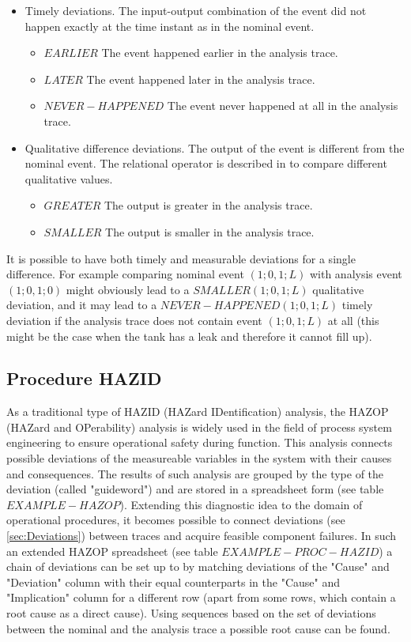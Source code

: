 \documentclass[conference]{IEEEtran}
\begin{document}
\begin{itemize}
\item Timely deviations. The input-output combination of the event did not happen exactly at the time instant as in the nominal event. 
	\begin{itemize}
	  \item $EARLIER$ The event happened earlier in the analysis trace.
	  \item $LATER$ The event happened later in the analysis trace.
	  \item $NEVER-HAPPENED$ The event never happened at all in the analysis trace.
	\end{itemize}
\item Qualitative difference deviations. The output of the event is different from the nominal event. The relational operator is described in \cite{QUALCAL} to compare different qualitative values.
	\begin{itemize}
	  \item $GREATER$ The output is greater in the analysis trace.
	  \item $SMALLER$ The output is smaller in the analysis trace.
	\end{itemize}
\end{itemize}

It is possible to have both timely and measurable deviations for a single difference. For example comparing nominal event $(1;0,1;L)$ with analysis event $(1;0,1;0)$ might obviously lead to a $SMALLER(1;0,1;L)$ qualitative deviation, and it may lead to a $NEVER-HAPPENED(1;0,1;L)$ timely deviation if the analysis trace does not contain event $(1;0,1;L)$ at all (this might be the case when the tank has a leak and therefore it cannot fill up).

\subsection{Procedure HAZID}
\label{sec:prochazid}

As a traditional type of HAZID (HAZard IDentification) analysis, the HAZOP (HAZard and OPerability) analysis is widely used in the field of process system engineering to ensure operational safety during function. This analysis connects possible deviations of the measureable variables in the system with their causes and consequences. The results of such analysis are grouped by the type of the deviation (called "guideword") and are stored in a spreadsheet form (see table $EXAMPLE-HAZOP$). Extending this diagnostic idea to the domain of operational procedures, it becomes possible to connect deviations (see \ref{sec:Deviations}) between traces and acquire feasible component failures. In such an extended HAZOP spreadsheet (see table $EXAMPLE-PROC-HAZID$) a chain of deviations can be set up to by matching deviations of the "Cause" and "Deviation" column with their equal counterparts in the "Cause" and "Implication" column for a different row (apart from some rows, which contain a root cause as a direct cause). Using sequences based on the set of deviations between the nominal and the analysis trace a possible root cause can be found. 
\end{document}
